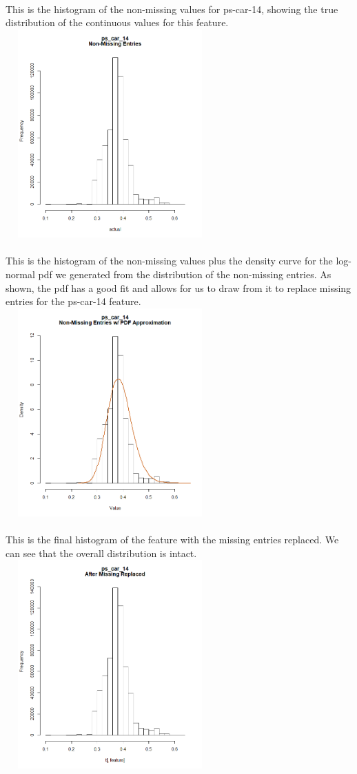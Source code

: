 \documentclass[fleqn,10pt]{SelfArx} %
\begin{document}
\\
\newpage
This is the histogram of the non-missing values for ps-car-14, showing the true distribution of the continuous values for this feature.\\ 
\includegraphics[width=8cm, height=8cm]{cont-actual} \\
\\
This is the histogram of the non-missing values plus the density curve for the log-normal pdf we generated from the distribution of the non-missing entries. As shown, the pdf has a good fit and allows for us to draw from it to replace missing entries for the ps-car-14 feature.\\ 
\includegraphics[width=8cm, height=8cm]{cont-pdf} \\
\\
This is the final histogram of the feature with the missing entries replaced. We can see that the overall distribution is intact.\\ 
\includegraphics[width=8cm, height=8cm]{cont-after} \\
\end{document}

